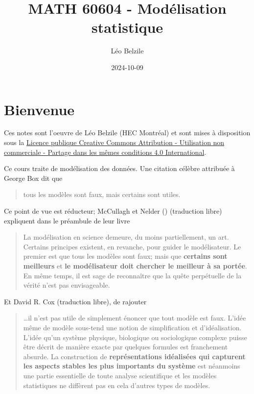 \documentclass[
  11pt,
  letterpaper,
]{scrbook}
\title{MATH 60604 - Modélisation statistique}
\author{Léo Belzile}
\date{2024-10-09}
\renewcommand*\contentsname{Table des matières}
\newcommand\contentsname{Table des matières}
\theoremstyle{plain}
\theoremstyle{definition}
\theoremstyle{plain}
\theoremstyle{definition}
\theoremstyle{remark}
\begin{document}


\renewcommand*\contentsname{Table des matières}
{
\setcounter{tocdepth}{2}
\tableofcontents
}

\mainmatter
{}

\chapter*{Bienvenue}\label{bienvenue}


Ces notes sont l'oeuvre de Léo Belzile (HEC Montréal) et sont mises à
disposition sous la
\href{https://creativecommons.org/licenses/by-nc-sa/4.0/legalcode.fr}{Licence
publique Creative Commons Attribution - Utilisation non commerciale -
Partage dans les mêmes conditions 4.0 International}.

Ce cours traite de modélisation des données. Une citation célèbre
attribuée à George Box dit que

\begin{quote}
tous les modèles sont faux, mais certains sont utiles.
\end{quote}

Ce point de vue est réducteur; McCullagh et Nelder
() (traduction libre)
expliquent dans le préambule de leur livre

\begin{quote}
La modélisation en science demeure, du moins partiellement, un art.
Certains principes existent, en revanche, pour guider le modélisateur.
Le premier est que tous les modèles sont faux; mais que \textbf{certains
sont meilleurs} et \textbf{le modélisateur doit chercher le meilleur à
sa portée}. En même temps, il est sage de reconnaître que la quête
perpétuelle de la vérité n'est pas envisageable.
\end{quote}

Et David R. Cox (traduction libre), de rajouter

\begin{quote}
\ldots il n'est pas utile de simplement énoncer que tout modèle est
faux. L'idée même de modèle sous-tend une notion de simplification et
d'idéalisation. L'idée qu'un système physique, biologique ou
sociologique complexe puisse être décrit de manière exacte par quelques
formules est franchement absurde. La construction de
\textbf{représentations idéalisées qui capturent les aspects stables les
plus importants du système} est néanmoins une partie essentielle de
toute analyse scientifique et les modèles statistiques ne diffèrent pas
en cela d'autres types de modèles.
\end{quote}
\end{document}
